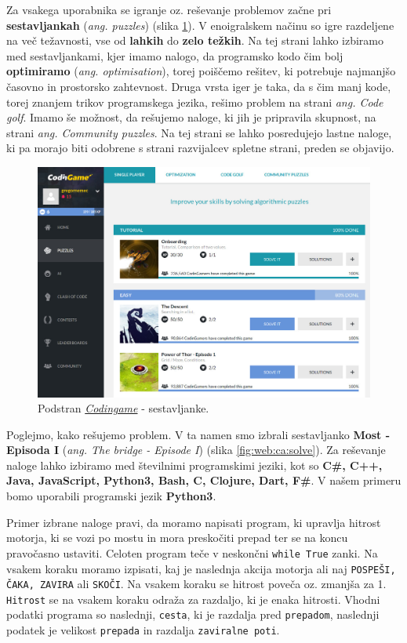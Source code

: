 Za vsakega uporabnika se igranje oz. reševanje problemov začne pri
\textbf{sestavljankah} (\emph{ang. puzzles}) (slika
\ref{fig:web:ca:puzz}). V enoigralskem načinu so igre razdeljene na
več težavnosti, vse od \textbf{lahkih} do \textbf{zelo težkih}. Na tej
strani lahko izbiramo med sestavljankami, kjer imamo nalogo, da
programsko kodo čim bolj \textbf{optimiramo}
(\emph{ang. optimisation}), torej poiščemo rešitev, ki potrebuje
najmanjšo časovno in prostorsko zahtevnost. Druga vrsta iger je taka,
da s čim manj kode, torej znanjem trikov programskega jezika, rešimo
problem na strani \emph{ang. Code golf}. Imamo še možnost, da
rešujemo naloge, ki jih je pripravila skupnost, na strani
\emph{ang. Community puzzles}. Na tej strani se lahko posredujejo
lastne naloge, ki pa morajo biti odobrene s strani razvijalcev spletne
strani, preden se objavijo.  

\begin{figure}[h!]
  \centering
    \includegraphics [width=0.75\linewidth, keepaspectratio =
   1] {./images/sc_web/codingame_puzz-v01.jpg}
   \caption{Podstran \emph{\href{https://www.codingame.com}{Codingame}}
\cite{web:codingame} - sestavljanke.}
   \label{fig:web:ca:puzz}
 \end{figure}

 Poglejmo, kako rešujemo problem. V ta namen smo izbrali sestavljanko
 \textbf{Most - Episoda I} (\emph{ang. The bridge - Episode I}) (slika
 \ref{fig:web:ca:solve}). Za reševanje naloge lahko izbiramo med
 številnimi programskimi jeziki, kot so \textbf{C\#, C++, Java,
   JavaScript, Python3, Bash, C, Clojure, Dart, F\#}. V našem primeru
 bomo uporabili programski jezik \textbf{Python3}.
 
 Primer izbrane naloge pravi, da moramo napisati program, ki upravlja
 hitrost motorja, ki se vozi po mostu in mora preskočiti prepad
 ter se na koncu pravočasno ustaviti. Celoten program teče v neskončni
 \texttt{while True} zanki. Na vsakem koraku moramo izpisati, kaj je
 naslednja akcija motorja ali naj \texttt{POSPEŠI, ČAKA, ZAVIRA}
 ali \texttt{SKOČI}. Na vsakem koraku se hitrost poveča oz. zmanjša za
 1. \texttt{Hitrost} se na vsakem koraku odraža za razdaljo, ki je
 enaka hitrosti. Vhodni podatki programa so naslednji, \texttt{cesta},
 ki je razdalja pred \texttt{prepadom}, naslednji podatek je velikost
 \texttt{prepada} in razdalja \texttt{zaviralne poti}.

